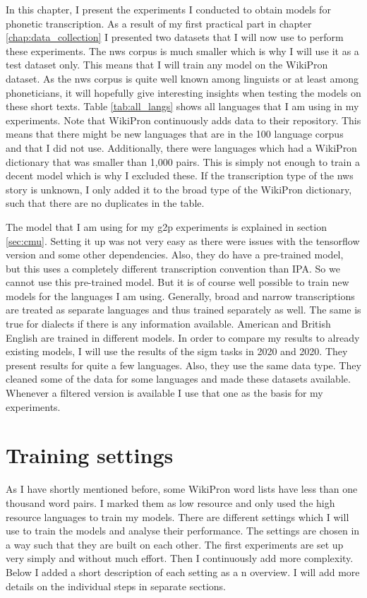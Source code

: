 
\label{chap:exp}
In this chapter, I present the experiments I conducted to obtain models for phonetic transcription. As a result of my first practical part in chapter \ref{chap:data_collection} I presented two datasets that I will now use to perform these experiments. The \ac{nws} corpus is much smaller which is why I will use it as a test dataset only. This means that I will train any model on the WikiPron dataset. As the \ac{nws} corpus is quite well known among linguists or at least among phoneticians, it will hopefully give interesting insights when testing the models on these short texts. Table \ref{tab:all_langs} shows all languages that I am using in my experiments. Note that WikiPron continuously adds data to their repository. This means that there might be new languages that are in the 100 language corpus and that I did not use. Additionally, there were languages which had a WikiPron dictionary that was smaller than 1,000 pairs. This is simply not enough to train a decent model which is why I excluded these. If the transcription type of the \ac{nws} story is unknown, I only added it to the broad type of the WikiPron dictionary, such that there are no duplicates in the table. 

The model that I am using for my \ac{g2p} experiments is explained in section \ref{sec:cmu}. Setting it up was not very easy as there were issues with the tensorflow version and some other dependencies. Also, they do have a pre-trained model, but this uses a completely different transcription convention than IPA. So we cannot use this pre-trained model. But it is of course well possible to train  new models for the languages I am using. Generally, broad and narrow transcriptions are treated as separate languages and thus trained separately as well. The same is true for dialects if there is any information available. American and British English are trained in different models. In order to compare my results to already existing models, I will use the results of the \ac{sigm} tasks in 2020 and 2020. They present results for quite a few languages. Also, they use the same data type. They cleaned some of the data for some languages and made these datasets available. Whenever a filtered version is available I use that one as the basis for my experiments. 

\section{Training settings}
As I have shortly mentioned before, some WikiPron word lists have less than one thousand word pairs. I marked them as low resource and only used the high resource languages to train my models. There are different settings which I will use to train the models and analyse their performance. The settings are chosen in a way such that they are built on each other. The first experiments are set up very simply and without much effort. Then I continuously add more complexity. Below I added a short description of each setting as a n overview. I will add more details on the individual steps in separate sections. 

